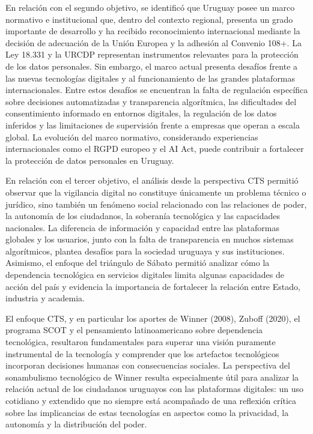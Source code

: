 \documentclass[11pt,a4paper]{article}
\begin{document}
En relación con el segundo objetivo, se identificó que Uruguay posee un marco normativo e institucional que, dentro del contexto regional, presenta un grado importante de desarrollo y ha recibido reconocimiento internacional mediante la decisión de adecuación de la Unión Europea y la adhesión al Convenio 108+. La Ley 18.331 y la URCDP representan instrumentos relevantes para la protección de los datos personales. Sin embargo, el marco actual presenta desafíos frente a las nuevas tecnologías digitales y al funcionamiento de las grandes plataformas internacionales. Entre estos desafíos se encuentran la falta de regulación específica sobre decisiones automatizadas y transparencia algorítmica, las dificultades del consentimiento informado en entornos digitales, la regulación de los datos inferidos y las limitaciones de supervisión frente a empresas que operan a escala global. La evolución del marco normativo, considerando experiencias internacionales como el RGPD europeo y el AI Act, puede contribuir a fortalecer la protección de datos personales en Uruguay.

En relación con el tercer objetivo, el análisis desde la perspectiva CTS permitió observar que la vigilancia digital no constituye únicamente un problema técnico o jurídico, sino también un fenómeno social relacionado con las relaciones de poder, la autonomía de los ciudadanos, la soberanía tecnológica y las capacidades nacionales. La diferencia de información y capacidad entre las plataformas globales y los usuarios, junto con la falta de transparencia en muchos sistemas algorítmicos, plantea desafíos para la sociedad uruguaya y sus instituciones. Asimismo, el enfoque del triángulo de Sábato permitió analizar cómo la dependencia tecnológica en servicios digitales limita algunas capacidades de acción del país y evidencia la importancia de fortalecer la relación entre Estado, industria y academia.

El enfoque CTS, y en particular los aportes de Winner (2008), Zuboff (2020), el programa SCOT y el pensamiento latinoamericano sobre dependencia tecnológica, resultaron fundamentales para superar una visión puramente instrumental de la tecnología y comprender que los artefactos tecnológicos incorporan decisiones humanas con consecuencias sociales. La perspectiva del sonambulismo tecnológico de Winner resulta especialmente útil para analizar la relación actual de los ciudadanos uruguayos con las plataformas digitales: un uso cotidiano y extendido que no siempre está acompañado de una reflexión crítica sobre las implicancias de estas tecnologías en aspectos como la privacidad, la autonomía y la distribución del poder.
\end{document}
